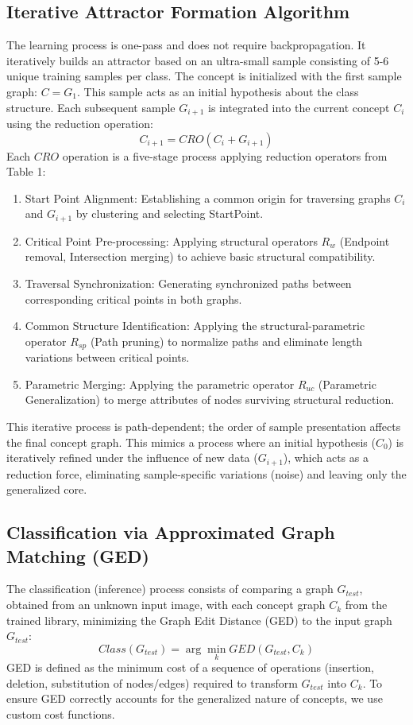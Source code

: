 \documentclass[conference]{IEEEtran}
\begin{document}
\subsection{Iterative Attractor Formation Algorithm}
The learning process is one-pass and does not require backpropagation. It iteratively builds an attractor based on an ultra-small sample consisting of 5-6 unique training samples per class. The concept is initialized with the first sample graph: $C = G_1$. This sample acts as an initial hypothesis about the class structure. Each subsequent sample $G_{i+1}$ is integrated into the current concept $C_i$ using the reduction operation: 
\[
C_{i+1} = CRO(C_i + G_{i+1})
\]
Each $CRO$ operation is a five-stage process applying reduction operators from Table 1:
\begin{enumerate}
    \item Start Point Alignment: Establishing a common origin for traversing graphs $C_i$ and $G_{i+1}$ by clustering and selecting StartPoint.
    \item Critical Point Pre-processing: Applying structural operators $R_w$ (Endpoint removal, Intersection merging) to achieve basic structural compatibility.
    \item Traversal Synchronization: Generating synchronized paths between corresponding critical points in both graphs.
    \item Common Structure Identification: Applying the structural-parametric operator $R_{sp}$ (Path pruning) to normalize paths and eliminate length variations between critical points.
    \item Parametric Merging: Applying the parametric operator $R_{uc}$ (Parametric Generalization) to merge attributes of nodes surviving structural reduction.
\end{enumerate}

This iterative process is path-dependent; the order of sample presentation affects the final concept graph. This mimics a process where an initial hypothesis ($C_0$) is iteratively refined under the influence of new data ($G_{i+1}$), which acts as a reduction force, eliminating sample-specific variations (noise) and leaving only the generalized core.

\subsection{Classification via Approximated Graph Matching (GED)}
The classification (inference) process consists of comparing a graph $G_{test}$, obtained from an unknown input image, with each concept graph $C_k$ from the trained library, minimizing the Graph Edit Distance (GED) to the input graph $G_{test}$: 
\[
Class(G_{test}) = \arg\min_k GED(G_{test}, C_k)
\]
GED is defined as the minimum cost of a sequence of operations (insertion, deletion, substitution of nodes/edges) required to transform $G_{test}$ into $C_k$. To ensure GED correctly accounts for the generalized nature of concepts, we use custom cost functions.
\end{document}
